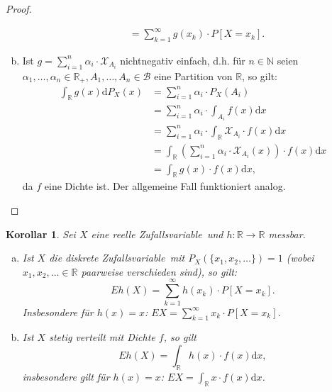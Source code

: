 \documentclass[a4paper,12pt,fleqn]{scrartcl}
\newcommand{\N}{\mathbb{N}}
\newcommand{\R}{\mathbb{R}}
\newcommand{\m}[1]{\mathcal{ #1 }}
\newcommand{\ZV}{Zufallsvariable}
\theoremstyle{definition}
\theoremstyle{plain}
\newtheorem{korollar}[definition]{Korollar}
\theoremstyle{remark}
\begin{document}
\begin{proof}
\begin{enumerate}[a)]
\begin{align*}
&= \sum_{k=1}^\infty g(x_k) \cdot P[X=x_k].
\end{align*}
\item Ist $g = \sum_{i=1}^n \alpha_i \cdot \m{X}_{A_i}$ nichtnegativ einfach, d.h. für $n \in \N$ seien $\alpha_1, \ldots, \alpha_n \in \R_+, A_1, \ldots, A_n \in \m{B}$ eine Partition von $\R$, so gilt:
\begin{align*}
\int_\R g(x) \mathrm{d}P_X(x) &= \sum_{i=1}^n \alpha_i \cdot P_X(A_i) \\
&= \sum_{i=1}^n \alpha_i \cdot \int_{A_i} f(x) \mathrm{d}x \\
&= \sum_{i=1}^n \alpha_i \cdot \int_{\R} \m{X}_{A_i} \cdot f(x) \mathrm{d}x \\
&= \int_\R (\sum_{i=1}^n \alpha_i \cdot \m{X}_{A_i} (x)) \cdot f(x) \mathrm{d}x \\
&= \int_\R g(x) \cdot f(x) \mathrm{d}x,
\end{align*}
da $f$ eine Dichte ist. Der allgemeine Fall funktioniert analog.
\end{enumerate}
\end{proof}
\begin{korollar}
Sei $X$ eine reelle \ZV \, und $h: \R \rightarrow \R$ messbar.
\begin{enumerate}[a)]
\item Ist $X$ die diskrete \ZV \, mit $P_X(\{x_1, x_2, \ldots\}) = 1$ (wobei $x_1, x_2, \ldots \in \R$ paarweise verschieden sind), so gilt:
\[Eh(X) = \sum_{k=1}^\infty h(x_k) \cdot P[X=x_k].\]
Insbesondere für $h(x)=x$: $EX = \sum_{k=1}^\infty x_k \cdot P[X=x_k]$.
\item Ist $X$ stetig verteilt mit Dichte $f$, so gilt
\[Eh(X) = \int_\R h(x) \cdot f(x) \mathrm{d}x,\]
insbesondere gilt für $h(x)=x$: $EX = \int_\R x \cdot f(x) \mathrm{d}x$.
\end{enumerate}
\end{korollar}
\end{document}
